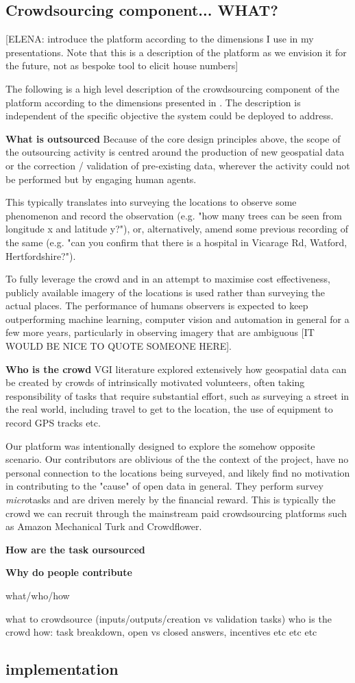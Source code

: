 \subsection{Crowdsourcing component... WHAT?}

[ELENA: introduce the platform according to the dimensions I use in my presentations. Note that this is a description of the platform as we envision it for the future, not as bespoke tool to elicit house numbers]

The following is a high level description of the crowdsourcing component of the platform according to the dimensions presented in \cite{Wearethedata:2015uo}. The description is independent of the specific objective the system could be deployed to address.

\textbf{What is outsourced} Because of the core design principles above, the scope of the outsourcing activity is centred around the production of new geospatial data or the correction / validation of pre-existing data, wherever the activity could not be performed but by engaging human agents. 

This typically translates into surveying the locations to observe some phenomenon and record the observation (e.g. "how many trees can be seen from longitude x and latitude y?"), or, alternatively, amend some previous recording of the same (e.g. "can you confirm that there is a hospital in Vicarage Rd, Watford, Hertfordshire?"). 

To fully leverage the crowd and in an attempt to maximise cost effectiveness, publicly available imagery of the locations is used rather than surveying the actual places. The performance of humans observers is expected to keep outperforming machine learning, computer vision and automation in general for a few more years, particularly in observing imagery that are ambiguous [IT WOULD BE NICE TO QUOTE SOMEONE HERE].

\textbf{Who is the crowd} VGI literature explored extensively how geospatial data can be created by crowds of intrinsically motivated volunteers, often taking responsibility of tasks that require substantial effort, such as surveying a street in the real world, including travel to get to the location, the use of equipment to record GPS tracks etc. 

Our platform was intentionally designed to explore the somehow opposite scenario. Our contributors are oblivious of the the context of the project, have no personal connection to the locations being surveyed, and likely find no motivation in contributing to the "cause" of open data in general. They perform survey {\it micro}tasks and are driven merely by the financial reward. This is typically the crowd we can recruit through the mainstream paid crowdsourcing platforms such as Amazon Mechanical Turk and Crowdflower. 

\textbf{How are the task oursourced}

\textbf{Why do people contribute}


what/who/how

what to crowdsource (inputs/outputs/creation vs validation tasks)
who is the crowd 
how: task breakdown, open vs closed answers, incentives etc etc etc

\subsection{implementation}